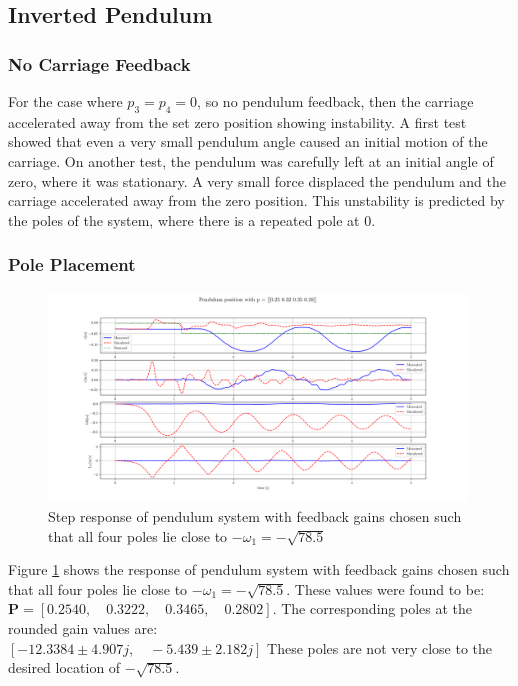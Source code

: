 \documentclass{article}
\begin{document}
\subsection{Inverted Pendulum}

\subsubsection{No Carriage Feedback}

For the case where $p_3 = p_4 = 0$, so no pendulum feedback, then the carriage accelerated away from the set zero position showing instability.
A first test showed that even a very small pendulum angle caused an initial motion of the carriage.
On another test, the pendulum was carefully left at an initial angle of zero, where it was stationary.
A very small force displaced the pendulum and the carriage accelerated away from the zero position. 
This unstability is predicted by the poles of the system, where there is a repeated pole at 0.

\subsubsection{Pole Placement}
\begin{figure}[H]
  \centering
  \includegraphics[width=0.99\textwidth]{figures/4.3.png}
  \caption{Step response of pendulum system with feedback gains chosen such that all four poles lie close to $-\omega_1 = -\sqrt{78.5}$}
  \label{fig:4.3}
\end{figure}

Figure \ref{fig:4.3} shows the response of pendulum system with feedback gains chosen such that all four poles lie close to $-\omega_1 = -\sqrt{78.5}$.
These values were found to be: \\
$\mathbf{P} = [0.2540, \quad 0.3222, \quad 0.3465, \quad 0.2802]$.
The corresponding poles at the rounded gain values are: \\
$[-12.3384 \pm 4.907j, \quad -5.439 \pm 2.182j]$
These poles are not very close to the desired location of $-\sqrt{78.5}$.
\end{document}
